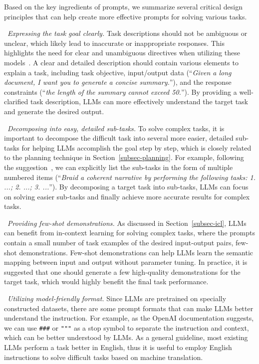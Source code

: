  Based on the key ingredients of prompts, we summarize several critical design principles that can help create more  effective prompts for solving various  tasks.

\textbullet~\emph{Expressing the task goal clearly.}  {Task descriptions should not be ambiguous or unclear, which likely lead to inaccurate or inappropriate responses.} This highlights the need for clear and unambiguous directives when utilizing these models~\cite{Ouyang-arxiv-2022-Training}. A clear and detailed description should contain various elements to explain a task, including task objective, input/output data (\eg ``\emph{Given a long document, I want you to generate a concise summary.}''),  and the response constraints (\eg ``\emph{the length of the summary cannot exceed 50.}''). By providing a well-clarified task description, LLMs can more effectively understand the target task and generate the desired output.

{
\textbullet~\emph{Decomposing into easy, detailed sub-tasks.} To solve complex tasks, it is important to decompose the difficult task into several more easier, detailed sub-tasks for helping LLMs accomplish the goal step by step, which is closely related to the planning technique in Section~\ref{subsec-planning}.
}
For example, following the suggestion~\cite{Santu-arxiv-2023-TELeR}, we can explicitly list the {sub-tasks in the form of multiple numbered items} (\eg ``\emph{Braid a coherent narrative by performing the following tasks: 1. ...; 2. ...; 3. ...}''). By decomposing a target task into sub-tasks, LLMs can focus on solving easier   sub-tasks and finally achieve more accurate results for complex tasks. 

\textbullet~\emph{Providing few-shot demonstrations.} As discussed in Section~\ref{subsec-icl},  LLMs can benefit from in-context learning for solving complex tasks, where the prompts contain a small number of task examples of the desired input-output pairs, \ie few-shot demonstrations. Few-shot demonstrations can help LLMs learn the semantic mapping between input and output without parameter tuning.
In practice, it is suggested that one should generate a few high-quality demonstrations for the target task, which would highly benefit the final task performance. 


\textbullet~\emph{Utilizing model-friendly format.} 
Since LLMs are pretrained on specially constructed datasets, there are some prompt formats that can make LLMs better understand the instruction. For example, as the OpenAI documentation suggests, we can use \texttt{\#\#\#} or \texttt{"""} as a stop symbol to separate the instruction and context, which can be better understood by LLMs. As a general guideline, most existing LLMs perform a task better in English, thus it is useful to employ English instructions to solve difficult tasks based on machine translation.


